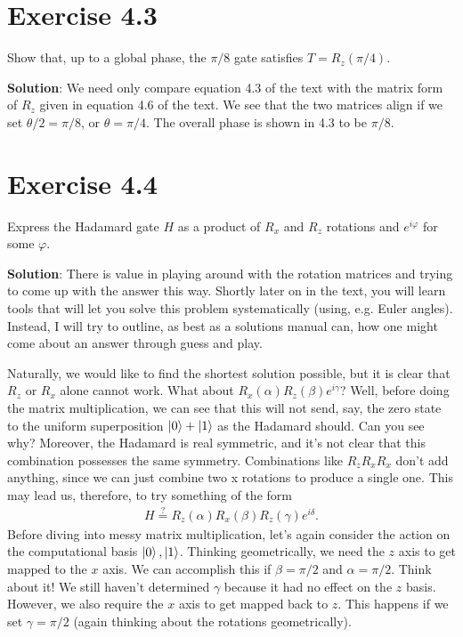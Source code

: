 \documentclass{book}
\begin{document}
\section*{Exercise 4.3}
    Show that, up to a global phase, the $\pi/8$ gate satisfies $T = R_z(\pi/4)$.
    
    \textbf{Solution}: We need only compare equation 4.3 of the text with the matrix form of $R_z$ given in equation 4.6 of the text. We see that the two matrices align if we set $\theta/2 = \pi/8$, or $\theta = \pi/4$. The overall phase is shown in 4.3 to be $\pi/8$.

\section*{Exercise 4.4}
    Express the Hadamard gate $H$ as a product of $R_x$ and $R_z$ rotations and $e^{i\varphi}$ for some $\varphi$.
    
    \textbf{Solution}: There is value in playing around with the rotation matrices and trying to come up with the answer this way. Shortly later on in the text, you will learn tools that will let you solve this problem systematically (using, e.g. Euler angles). Instead, I will try to outline, as best as a solutions manual can, how one might come about an answer through guess and play.
    
    Naturally, we would like to find the shortest solution possible, but it is clear that $R_z$ or $R_x$ alone cannot work. What about $R_x(\alpha) R_z(\beta) e^{i\gamma}$? Well, before doing the matrix multiplication, we can see that this will not send, say, the zero state to the uniform superposition $\ket{0} + \ket{1}$ as the Hadamard should. Can you see why? Moreover, the Hadamard is real symmetric, and it's not clear that this combination possesses the same symmetry. Combinations like $R_z R_x R_x$ don't add anything, since we can just combine two x rotations to produce a single one. This may lead us, therefore, to try something of the form
    \begin{align}
        H \stackrel{?}{=}  R_z(\alpha) R_x(\beta) R_z(\gamma) e^{i\delta}.
    \end{align}
    Before diving into messy matrix multiplication, let's again consider the action on the computational basis $\ket{0}, \ket{1}$. Thinking geometrically, we need the $z$ axis to get mapped to the $x$ axis. We can accomplish this if $\beta = \pi/2$ and $\alpha = \pi/2$. Think about it! We still haven't determined $\gamma$ because it had no effect on the $z$ basis. However, we also require the $x$ axis to get mapped back to $z$. This happens if we set $\gamma = \pi/2$ (again thinking about the rotations geometrically). 
    
\end{document}
